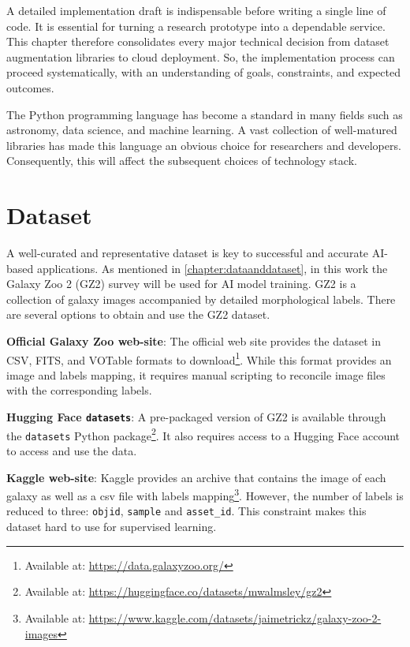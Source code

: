 A detailed implementation draft is indispensable before writing a single line of code. It is essential for turning a research prototype into a dependable service. This chapter therefore consolidates every major technical decision from dataset augmentation libraries to cloud deployment. So, the implementation process can proceed systematically, with an understanding of goals, constraints, and expected outcomes.

The Python programming language has become a standard in many fields such as astronomy, data science, and machine learning. A vast collection of well-matured libraries has made this language an obvious choice for researchers and developers. Consequently, this will affect the subsequent choices of technology stack.

\section*{Dataset}
\label{sec:dataset_acquisition}

A well-curated and representative dataset is key to successful and accurate AI-based applications. As mentioned in \autoref{chapter:dataanddataset}, in this work the Galaxy Zoo 2 (GZ2) survey will be used for AI model training. GZ2 is a collection of galaxy images accompanied by detailed morphological labels. There are several options to obtain and use the GZ2 dataset.

\medskip

\textbf{Official Galaxy Zoo web-site}:
The official web site provides the dataset in CSV, FITS, and VOTable formats to download\footnote{Available at: \url{https://data.galaxyzoo.org/}}.
While this format provides an image and labels mapping, it requires manual scripting to reconcile image files with the corresponding labels.

\medskip

\textbf{Hugging Face \texttt{datasets}}:
A pre-packaged version of GZ2 is available through the \texttt{datasets} Python package\footnote{Available at: \url{https://huggingface.co/datasets/mwalmsley/gz2}}. It also requires access to a Hugging Face account to access and use the data.

\medskip

\textbf{Kaggle web-site}:
Kaggle provides an archive that contains the image of each galaxy as well as a csv file with labels mapping\footnote{Available at: \url{https://www.kaggle.com/datasets/jaimetrickz/galaxy-zoo-2-images}}. However, the number of labels is reduced to three: \texttt{objid}, \texttt{sample} and \texttt{asset\_id}. This constraint makes this dataset hard to use for supervised learning.

